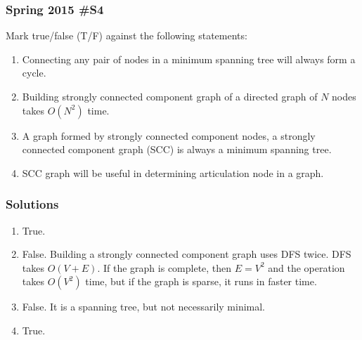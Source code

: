 \subsubsection{Spring 2015  \#S4}

Mark true/false (T/F) against the following statements:
	\begin{enumerate}
		\item Connecting any pair of nodes in a minimum spanning tree will always form a cycle.
		\item Building strongly connected component graph of a directed graph of $N$ nodes takes $O(N^2)$ time.  
		\item A graph formed by strongly connected component nodes, a strongly connected component graph (SCC) is always a minimum spanning tree.
		\item SCC graph will be useful in determining articulation node in a graph.
	\end{enumerate}
	
\subsubsection{Solutions}

\begin{enumerate}
	\item True.
	\item False.  Building a strongly connected component graph uses DFS twice.  DFS takes $O(V+E)$.  If the graph is complete, then $E = V^2$ and the operation takes $O(V^2)$ time, but if the graph is sparse, it runs in faster time.  
	\item False.  It is a spanning tree, but not necessarily minimal.  
	\item True.  	
\end{enumerate}
